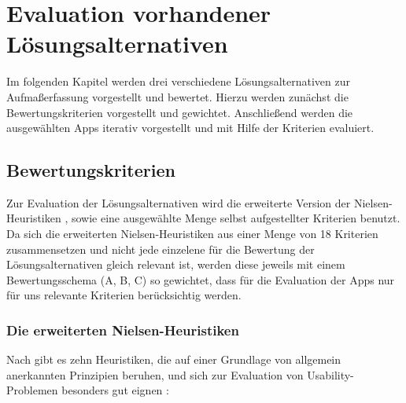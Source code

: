 \chapter{Evaluation vorhandener Lösungsalternativen}
Im folgenden Kapitel werden drei verschiedene Lösungsalternativen zur Aufmaßerfassung vorgestellt und bewertet.
Hierzu werden zunächst die Bewertungskriterien vorgestellt und gewichtet.
Anschließend werden die ausgewählten Apps iterativ vorgestellt und mit Hilfe der Kriterien evaluiert.

\section{Bewertungskriterien}
Zur Evaluation der Lösungsalternativen wird die erweiterte Version der Nielsen-Heuristiken \citep{Nielsen94}, sowie eine ausgewählte Menge selbst aufgestellter Kriterien benutzt.
Da sich die erweiterten Nielsen-Heuristiken aus einer Menge von 18 Kriterien zusammensetzen und nicht jede einzelene für die Bewertung der Lösungsalternativen gleich relevant ist, werden diese jeweils mit einem Bewertungsschema (A, B, C) so gewichtet, dass für die Evaluation der Apps nur für uns relevante Kriterien berücksichtig werden. \\

\subsection{Die erweiterten Nielsen-Heuristiken}\label{subsec:nielsen}
 Nach \citeauthor{Nielsen94} gibt es zehn Heuristiken, die auf einer Grundlage von allgemein anerkannten Prinzipien beruhen, und sich zur Evaluation von Usability-Problemen besonders gut eignen \citep[Seite.~25--62]{Nielsen94}: 

\begin{enumerate}
\end{enumerate} 

